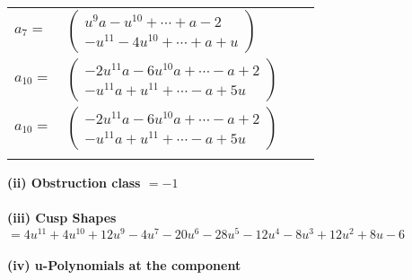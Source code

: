 \documentclass[1p]{elsarticle_modified}
\theoremstyle{definition}
\begin{document}
\begin{tabular}{m{7pt} m{180pt} m{7pt} m{180pt} }
\flushright $a_{7}=$&$\begin{pmatrix}u^9 a- u^{10}+\cdots+a-2\\- u^{11}-4 u^{10}+\cdots+a+u\end{pmatrix}$ \\
\flushright $a_{10}=$&$\begin{pmatrix}-2 u^{11} a-6 u^{10} a+\cdots- a+2\\- u^{11} a+u^{11}+\cdots- a+5 u\end{pmatrix}$\\ \flushright $a_{10}=$&$\begin{pmatrix}-2 u^{11} a-6 u^{10} a+\cdots- a+2\\- u^{11} a+u^{11}+\cdots- a+5 u\end{pmatrix}$\\&\end{tabular}
\flushleft \textbf{(ii) Obstruction class $= -1$}\\~\\
\flushleft \textbf{(iii) Cusp Shapes $= 4 u^{11}+4 u^{10}+12 u^9-4 u^7-20 u^6-28 u^5-12 u^4-8 u^3+12 u^2+8 u-6$}\\~\\
\newpage\renewcommand{\arraystretch}{1}
\flushleft \textbf{(iv) u-Polynomials at the component}\newline \\
\end{document}
